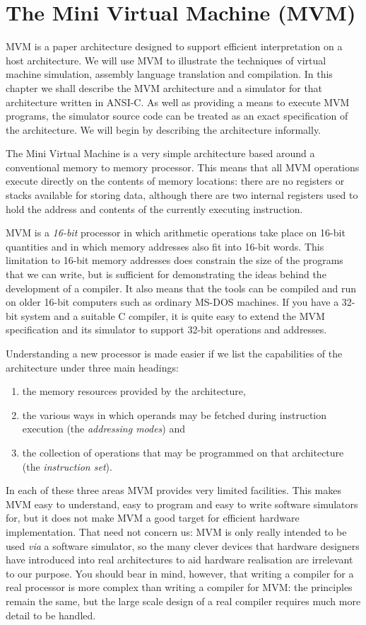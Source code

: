 \chapter{The Mini Virtual Machine (MVM)}

MVM is a paper architecture designed to support efficient interpretation
on a host architecture. We will use MVM to illustrate the techniques  of
virtual machine simulation, assembly language translation and
compilation. In this chapter we shall describe the MVM architecture and
a simulator for that architecture written in ANSI-C. As well as
providing a means to execute MVM programs, the simulator source code can
be treated as an exact specification of the architecture. We will begin
by describing the architecture informally.

The Mini Virtual Machine is a very simple architecture based
around a conventional memory to memory processor. This means that all
MVM operations execute directly on the contents of memory locations:
there are no registers or stacks available for storing data, although
there are two internal registers used to hold the address and contents
of the currently executing instruction. 

MVM is a {\em 16-bit} processor in which arithmetic operations take
place on 16-bit quantities and in which memory addresses also fit into
16-bit words. This limitation to 16-bit memory addresses does constrain
the size of the programs that we can write, but is sufficient for
demonstrating the ideas behind the development of a compiler. It also
means that the tools can be compiled and run on older 16-bit computers
such as ordinary MS-DOS machines. If you have a 32-bit system and a
suitable C compiler, it is quite easy to extend the MVM specification
and its simulator to support 32-bit operations and addresses.

Understanding a new processor is made easier if we list the capabilities
of the architecture under three main headings: \begin{enumerate} \item
the memory resources provided by the architecture, \item the various
ways in which operands may be fetched during instruction execution (the
{\em addressing modes}) and \item the collection of operations that may
be programmed on that architecture (the {\em instruction set}). 
\end{enumerate}

In each of these three areas MVM provides very limited facilities. This
makes MVM easy to understand, easy to program and easy to write software
simulators for, but it does not make MVM a good target for efficient
hardware implementation. That need not concern us: MVM is only really
intended to be used {\em via} a software simulator, so the many clever
devices that hardware designers have introduced into real architectures
to aid hardware realisation are irrelevant to our purpose. You should
bear in mind, however, that writing a compiler for a real processor is
more complex than writing a compiler for MVM: the principles remain the
same, but the large scale design of a real compiler requires much more
detail to be handled.

